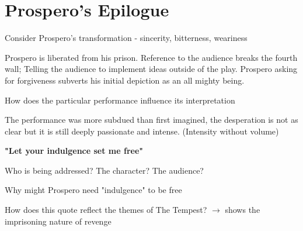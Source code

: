 \section{Prospero's Epilogue} \label{25/03/2025}
	
	Consider Prospero's transformation - sincerity, bitterness, weariness

		Prospero is liberated from his prison. Reference to the audience breaks the fourth wall; Telling the audience to implement ideas outside of the play. Prospero asking for forgiveness subverts his initial depiction as an all mighty being.
	
	How does the particular performance influence its interpretation

		The performance was more subdued than first imagined, the desperation is not as clear but it is still deeply passionate and intense. (Intensity without volume)

	\begin{center}
		\large	
		\textbf{"Let your indulgence set me free"}
	\end{center}

	Who is being addressed? The character? The audience?

	Why might Prospero need "indulgence" to be free

	How does this quote reflect the themes of The Tempest? $\rightarrow$ shows the imprisoning nature of revenge
